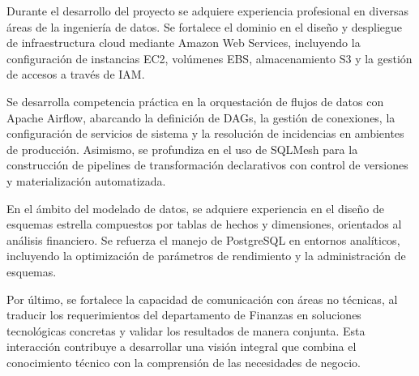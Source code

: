 Durante el desarrollo del proyecto se adquiere experiencia profesional en diversas áreas de la ingeniería de datos. Se fortalece el dominio en el diseño y despliegue de infraestructura cloud mediante Amazon Web Services, incluyendo la configuración de instancias EC2, volúmenes EBS, almacenamiento S3 y la gestión de accesos a través de IAM.

Se desarrolla competencia práctica en la orquestación de flujos de datos con Apache Airflow, abarcando la definición de DAGs, la gestión de conexiones, la configuración de servicios de sistema y la resolución de incidencias en ambientes de producción. Asimismo, se profundiza en el uso de SQLMesh para la construcción de pipelines de transformación declarativos con control de versiones y materialización automatizada.

En el ámbito del modelado de datos, se adquiere experiencia en el diseño de esquemas estrella compuestos por tablas de hechos y dimensiones, orientados al análisis financiero. Se refuerza el manejo de PostgreSQL en entornos analíticos, incluyendo la optimización de parámetros de rendimiento y la administración de esquemas. 

Por último, se fortalece la capacidad de comunicación con áreas no técnicas, al traducir los requerimientos del departamento de Finanzas en soluciones tecnológicas concretas y validar los resultados de manera conjunta. Esta interacción contribuye a desarrollar una visión integral que combina el conocimiento técnico con la comprensión de las necesidades de negocio.
